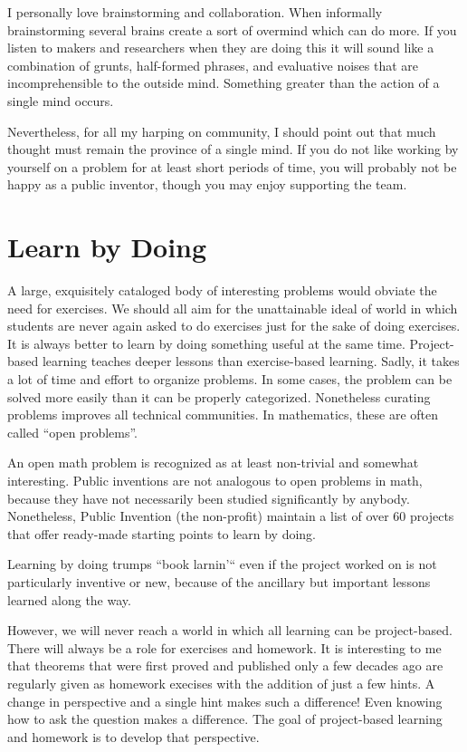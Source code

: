 \documentclass[
	fontsize=10pt, %
	twoside=false, %
	secnumdepth=1, %
]{kaobook}
\begin{document}
I personally love brainstorming and collaboration.
When informally brainstorming several brains create a sort
of overmind which can do more.
If you listen to makers and researchers when they are doing this
it will sound like a combination of grunts, half-formed phrases,
and evaluative noises that are incomprehensible to the outside
mind. Something greater than the action
of a single mind occurs.

Nevertheless, for all my harping on community, I should point
out that much thought must remain the province of a single mind.
If you do not like working by yourself on a problem for at least
short periods of time, you will probably not be happy
as a public inventor, though you may enjoy supporting the team.

\section{Learn by Doing}

A large, exquisitely cataloged body of interesting problems would obviate
the need for exercises.
We should all aim for the unattainable ideal of world in which students are never again
asked to do exercises just for the sake of doing exercises.
It is always better to learn by doing something useful at the same time.
Project-based learning teaches deeper lessons than exercise-based learning.
Sadly, it takes a lot of time and effort to organize problems.
In some cases, the problem can be solved more easily than it can be properly categorized.
Nonetheless curating problems improves all technical communities.
In mathematics, these are often called ``open problems''.

An open math problem
is recognized as at least non-trivial and somewhat interesting.
Public inventions are not analogous to open problems in math, because they
have not necessarily been studied significantly by anybody.
Nonetheless, Public Invention (the non-profit)  maintain a list of over 60 projects that offer ready-made
starting points to learn by doing.

Learning by doing trumps ``book larnin'`` even if the project worked on
is not particularly inventive or new, because of the ancillary but important
lessons learned along the way.

However, we will never reach a world in which all learning can be project-based.
There will always be a role for exercises and homework.
It is interesting to me that theorems that were first proved and published only a few decades
ago are regularly given as homework execises with the addition of just a few hints.
A change in perspective and a single hint makes such a  difference!
Even knowing how to ask the question makes a difference.
The goal of project-based learning and homework is to develop that perspective.
\end{document}
